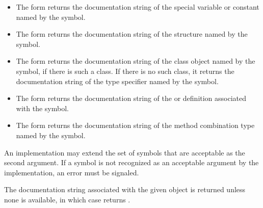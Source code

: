 \begin{defun}
\begin{itemize}
\begin{itemize}
\item
The form  returns the
documentation string of the special variable or constant named by the
symbol.

\item
The form  returns the
documentation string of the  structure named by the
symbol.

\item
The form  returns the documentation
string of the class object named by the symbol, if there is such a
class.   If there is no such class, it returns the documentation string
of the type specifier named by the symbol. 

\item
The form  returns the documentation
string of the  or  definition
associated with the symbol.

\item
The form  returns the
documentation string of the method combination type named by the
symbol.  
\end{itemize}

\end{itemize}

An implementation may extend the set of symbols that are acceptable as
the second argument.  If a symbol is not recognized as an acceptable
argument by the implementation, an error must be signaled.


The documentation string associated with the given object is returned
unless none is available, in which case  returns
.

\end{defun}


